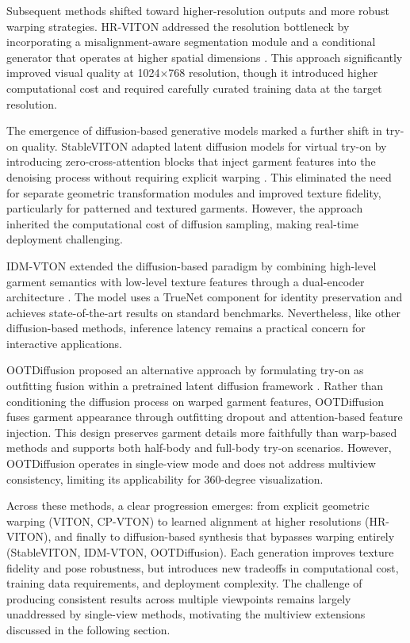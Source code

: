Subsequent methods shifted toward higher-resolution outputs and more robust warping strategies. HR-VITON addressed the resolution bottleneck by incorporating a misalignment-aware segmentation module and a conditional generator that operates at higher spatial dimensions \cite{lee2022hrviton}. This approach significantly improved visual quality at 1024$\times$768 resolution, though it introduced higher computational cost and required carefully curated training data at the target resolution.

The emergence of diffusion-based generative models marked a further shift in try-on quality. StableVITON adapted latent diffusion models for virtual try-on by introducing zero-cross-attention blocks that inject garment features into the denoising process without requiring explicit warping \cite{kim2024stableviton}. This eliminated the need for separate geometric transformation modules and improved texture fidelity, particularly for patterned and textured garments. However, the approach inherited the computational cost of diffusion sampling, making real-time deployment challenging.

IDM-VTON extended the diffusion-based paradigm by combining high-level garment semantics with low-level texture features through a dual-encoder architecture \cite{choi2024idmvton}. The model uses a TrueNet component for identity preservation and achieves state-of-the-art results on standard benchmarks. Nevertheless, like other diffusion-based methods, inference latency remains a practical concern for interactive applications.

OOTDiffusion proposed an alternative approach by formulating try-on as outfitting fusion within a pretrained latent diffusion framework \cite{xu2024ootdiffusion}. Rather than conditioning the diffusion process on warped garment features, OOTDiffusion fuses garment appearance through outfitting dropout and attention-based feature injection. This design preserves garment details more faithfully than warp-based methods and supports both half-body and full-body try-on scenarios. However, OOTDiffusion operates in single-view mode and does not address multiview consistency, limiting its applicability for 360-degree visualization.

Across these methods, a clear progression emerges: from explicit geometric warping (VITON, CP-VTON) to learned alignment at higher resolutions (HR-VITON), and finally to diffusion-based synthesis that bypasses warping entirely (StableVITON, IDM-VTON, OOTDiffusion). Each generation improves texture fidelity and pose robustness, but introduces new tradeoffs in computational cost, training data requirements, and deployment complexity. The challenge of producing consistent results across multiple viewpoints remains largely unaddressed by single-view methods, motivating the multiview extensions discussed in the following section.

